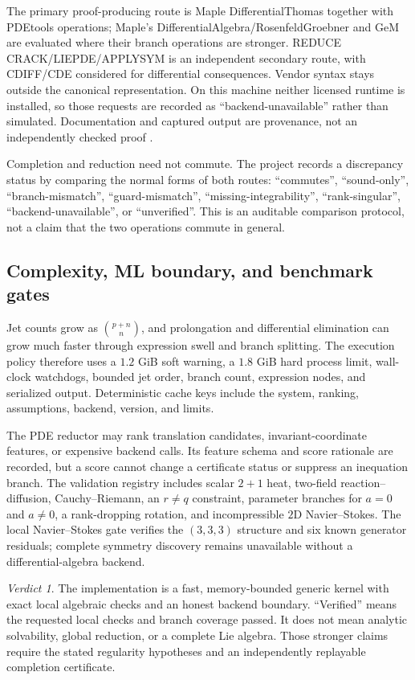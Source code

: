 \documentclass[11pt]{article}
\theoremstyle{definition}
\theoremstyle{remark}
\newtheorem*{verdict}{Verdict}
\begin{document}
The primary proof-producing route is Maple DifferentialThomas together with PDEtools operations; Maple's
DifferentialAlgebra/RosenfeldGroebner and GeM are evaluated where their branch operations are stronger.
REDUCE CRACK/LIEPDE/APPLYSYM is an independent secondary route, with CDIFF/CDE considered for differential
consequences. Vendor syntax stays outside the canonical representation. On this machine neither licensed
runtime is installed, so those requests are recorded as ``backend-unavailable'' rather than simulated.
Documentation and captured output are provenance, not an independently checked proof
\cite{mapleDT,maplePDE,mapleRG,reduceLie,reduceCrack,reduceCDIFF}.

Completion and reduction need not commute. The project records a discrepancy status by comparing the
normal forms of both routes: ``commutes'', ``sound-only'', ``branch-mismatch'', ``guard-mismatch'',
``missing-integrability'', ``rank-singular'', ``backend-unavailable'', or ``unverified''. This is an
auditable comparison protocol, not a claim that the two operations commute in general.

\subsection{Complexity, ML boundary, and benchmark gates}

Jet counts grow as ${p+n\choose n}$, and prolongation and differential elimination can grow much faster
through expression swell and branch splitting. The execution policy therefore uses a $1.2$ GiB soft
warning, a $1.8$ GiB hard process limit, wall-clock watchdogs, bounded jet order, branch count, expression
nodes, and serialized output. Deterministic cache keys include the system, ranking, assumptions, backend,
version, and limits.

The PDE reductor may rank translation candidates, invariant-coordinate features, or expensive backend
calls. Its feature schema and score rationale are recorded, but a score cannot change a certificate status
or suppress an inequation branch. The validation registry includes scalar $2+1$ heat, two-field reaction--
diffusion, Cauchy--Riemann, an $r\ne q$ constraint, parameter branches for $a=0$ and $a\ne0$, a
rank-dropping rotation, and incompressible $2$D Navier--Stokes. The local Navier--Stokes gate verifies the
$(3,3,3)$ structure and six known generator residuals; complete symmetry discovery remains unavailable
without a differential-algebra backend.

\begin{verdict}
The implementation is a fast, memory-bounded generic kernel with exact local algebraic checks and an
honest backend boundary. ``Verified'' means the requested local checks and branch coverage passed. It does
not mean analytic solvability, global reduction, or a complete Lie algebra. Those stronger claims require
the stated regularity hypotheses and an independently replayable completion certificate.
\end{verdict}
\end{document}
